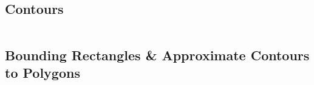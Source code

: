 \documentclass[a4paper, 10pt]{article}
\begin{document}

\begin{lstlisting}[language = C++]

\end{lstlisting}


\subsection{Contours}

%

\begin{lstlisting}[language = C++]

\end{lstlisting}


\subsection{Bounding Rectangles \& Approximate Contours to Polygons}

\end{document}
